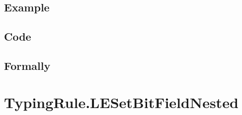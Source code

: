 \documentclass{book}
\begin{document}
  \subsection{Example}

  \subsection{Code}

\begin{emptyformal}
    \subsection{Formally}
\end{emptyformal}


\section{TypingRule.LESetBitFieldNested \label{sec:TypingRule.LESetBitFieldNested}}
\end{document}
